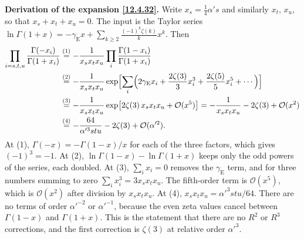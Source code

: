 \begin{tcolorbox}[breakable]
	\begin{remark}
		\textbf{Derivation of the expansion \eqref{12.4.32}.} Write $x_{s}=\frac14\alpha's$ and similarly $x_{t}$, $x_{u}$, so that $x_{s}+x_{t}+x_{u}=0$. The input is the Taylor series $\ln\Gamma(1+x)=-\gamma_{\mathrm E}x+\sum_{k\ge2}\frac{(-1)^{k}\zeta(k)}{k}x^{k}$. Then
		\begin{align*}
			\prod_{i=s,t,u}\frac{\Gamma(-x_{i})}{\Gamma(1+x_{i})}
			&\overset{(1)}{=} -\frac{1}{x_{s}x_{t}x_{u}}\prod_{i}\frac{\Gamma(1-x_{i})}{\Gamma(1+x_{i})}\\
			&\overset{(2)}{=} -\frac{1}{x_{s}x_{t}x_{u}}\exp\Bigl[\sum_{i}\Bigl(2\gamma_{\mathrm E}x_{i}+\frac{2\zeta(3)}{3}x_{i}^{3}+\frac{2\zeta(5)}{5}x_{i}^{5}+\cdots\Bigr)\Bigr]\\
			&\overset{(3)}{=} -\frac{1}{x_{s}x_{t}x_{u}}\exp\bigl[2\zeta(3)\,x_{s}x_{t}x_{u}+\mathcal O(x^{5})\bigr]
			=-\frac{1}{x_{s}x_{t}x_{u}}-2\zeta(3)+\mathcal O(x^{2})\\
			&\overset{(4)}{=} -\frac{64}{\alpha'^{3}stu}-2\zeta(3)+\mathcal O(\alpha'^{2}) .
		\end{align*}
		At (1), $\Gamma(-x)=-\Gamma(1-x)/x$ for each of the three factors, which gives $(-1)^{3}=-1$. At (2), $\ln\Gamma(1-x)-\ln\Gamma(1+x)$ keeps only the odd powers of the series, each doubled. At (3), $\sum_{i}x_{i}=0$ removes the $\gamma_{\mathrm E}$ term, and for three numbers summing to zero $\sum_{i}x_{i}^{3}=3x_{s}x_{t}x_{u}$. The fifth-order term is $\mathcal O(x^{5})$, which is $\mathcal O(x^{2})$ after division by $x_{s}x_{t}x_{u}$. At (4), $x_{s}x_{t}x_{u}=\alpha'^{3}stu/64$. There are no terms of order $\alpha'^{-2}$ or $\alpha'^{-1}$, because the even zeta values cancel between $\Gamma(1-x)$ and $\Gamma(1+x)$. This is the statement that there are no $R^{2}$ or $R^{3}$ corrections, and the first correction is $\zeta(3)$ at relative order $\alpha'^{3}$.
	\end{remark}
\end{tcolorbox}

